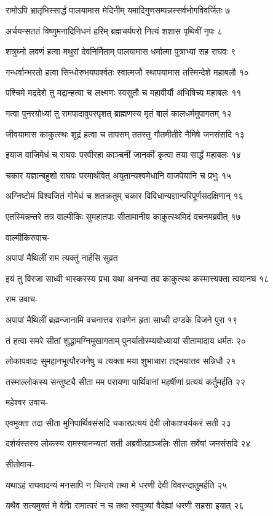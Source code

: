 रामोऽपि भ्रातृभिस्सार्द्धं पालयामास मेदिनीम्
यमादिगुणसम्पन्नस्सर्वभोगविवर्जितः ७

अर्चयन्सततं विष्णुमनादिनिधनं हरिम्
ब्रह्मचर्यपरो नित्यं शशास पृथिवीं नृपः ८

शत्रुघ्नो लवणं हत्वा मथुरां देवनिर्मिताम्
पालयामास धर्मात्मा पुत्राभ्यां सह राघवः ९

गन्धर्वान्भरतो हत्वा सिन्धोरुभयपार्श्वतः
स्वात्मजौ स्थापयामास तस्मिन्देशे महाबलौ १०

पश्चिमे मद्रदेशे तु मद्रान्हत्वा च लक्ष्मणः
स्वसुतौ च महावीर्यौ अभिषिच्य महाबलः ११

गत्वा पुनरयोध्यां तु रामपादावुपस्पृशत्
ब्राह्मणस्य मृतं बालं कालधर्ममुपागतम् १२

जीवयामास काकुत्स्थः शूद्रं हत्वा च तापसम्
ततस्तु गौतमीतीरे नैमिषे जनसंसदि १३

इयाज वाजिमेधं च राघवः परवीरहा
काञ्चनीं जानकीं कृत्वा तया सार्द्धं महाबलः १४

चकार यज्ञान्बहुशो राघवः परमार्थवित्
अयुतान्यश्वमेधानि वाजपेयानि च प्रभुः १५

अग्निष्टोमं विश्वजितं गोमेधं च शतक्रतुम्
चकार विविधान्यज्ञान्परिपूर्णसदक्षिणान् १६

एतस्मिन्नन्तरे तत्र वाल्मीकिः सुमहातपाः
सीतामानीय काकुत्स्थमिदं वचनमब्रवीत् १७

वाल्मीकिरुवाच-

अपापां मैथिलीं राम त्यक्तुं नार्हसि सुव्रत

इयं तु विरजा साध्वी भास्करस्य प्रभा यथा
अनन्या तव काकुत्स्थ कस्मात्त्यक्ता त्वयानघ १८

राम उवाच-

अपापां मैथिलीं ब्रह्मन्जानामि वचनात्तव
रावणेन हृता साध्वी दण्डके विजने पुरा १९

तं हत्वा समरे सीतां शुद्धामग्निमुखागताम्
पुनर्यातोस्म्ययोध्यायां सीतामादाय धर्मतः २०

लोकापवादः सुमहानभूत्पौरजनेषु च
त्यक्ता मया शुभाचारा तद्भयात्तव सन्निधौ २१

तस्माल्लोकस्य सन्तुष्ट्यै सीता मम परायणा
पार्थिवानां महर्षीणां प्रत्ययं कर्तुमर्हति २२

महेश्वर उवाच-

एवमुक्ता तदा सीता मुनिपार्थिवसंसदि
चकारप्रत्ययं देवी लोकाश्चर्यकरं सती २३

दर्शयंस्तस्य लोकस्य रामस्यानन्यतां सती
अब्रवीत्प्राञ्जलिः सीता सर्वेषां जनसंसदि २४

सीतोवाच-

यथाऽहं राघवादन्यं मनसापि न चिन्तये
तथा मे धरणी देवी विवरन्दातुमर्हति २५

यथैव सत्यमुक्तं मे वेद्मि रामात्परं न च
तथा स्वपुत्र्यां वैदेह्यां धरणी सहसा इयात् २६

